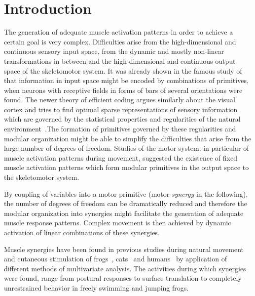 \chapter{Introduction} %
\label{sg:cha:introduction}

The generation of adequate muscle activation patterns in order to achieve a certain goal is very complex. Difficulties arise from the high-dimensional and continuous sensory input space, from the dynamic and mostly non-linear transformations in between and the high-dimensional and continuous output space of the skeletomotor system. It was already shown in the famous study of \citet{Hubel:1959p3833} that information in input space might be encoded by combinations of primitives, when neurons with receptive fields in forms of bars of several orientations were found. The newer theory of efficient coding argues similarly about the visual cortex and tries to find optimal sparse representations of sensory information which are governed by the statistical properties and regularities of the natural environment~\citet{Olshausen:1996p3611}.The formation of primitives governed by these regularities and modular organization might be able to simplify the difficulties that arise from the large number of degrees of freedom. Studies of the motor system, in particular of muscle activation patterns during movement, suggested the existence of fixed muscle activation patterns which form modular primitives in the output space to the skeletomotor system. 

By coupling of variables into a motor primitive (motor-\emph{synergy} in the following), the number of degrees of freedom can be dramatically reduced and therefore the modular organization into synergies might facilitate the generation of adequate muscle response patterns. Complex movement is then achieved by dynamic activation of linear combinations of these synergies.

Muscle synergies have been found in previous studies during natural movement and cutaneous stimulation of frogs~\citet{Tresch:1999p3783,Hart:2004p3786,Davella:2003p3784,Cheung:2005p3778}, cats~\citet{Ting:2004p3785} and humans~\citet{Merkle:1998p3780,Weiss:2004p3782,Krishnamoorthy:2003p3787,Olree:1995p3781,Ivanenko:2003p3779} by application of different methods of multivariate analysis. The activities during which synergies were found, range from postural responses to surface translation to completely unrestrained behavior in freely swimming and jumping frogs.


